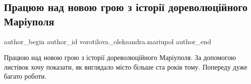  
 
 
 
 

\subsection{Працюю над новою грою з історії дореволюційного Маріуполя}
\label{sec:05_05_2023.fb.vorotilova_oleksandra.mariupol.1.nova_gra_istoria_dorev_mariupol}

\ifcmt
 author_begin
   author_id vorotilova_oleksandra.mariupol
 author_end
\fi

Працюю над новою грою з історії дореволюційного Маріуполя. За допомогою
листівок хочу показати, як виглядало місто більше ста років тому. Попереду дуже
багато роботи.
